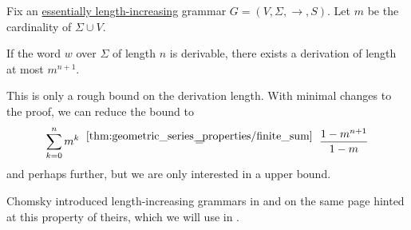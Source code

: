 \begin{lemma}\label{thm:length_increasing_grammar}
  Fix an \hyperref[def:length_increasing_grammar]{essentially length-increasing} grammar \( G = (V, \Sigma, \to, S) \). Let \( m \) be the cardinality of \( \Sigma \cup V \).

  If the word \( w \) over \( \Sigma \) of length \( n \) is derivable, there exists a derivation of length at most \( m^{n+1} \).
\end{lemma}
\begin{comments}
  \item This is only a rough bound on the derivation length. With minimal changes to the proof, we can reduce the bound to
  \begin{equation*}
    \sum_{k=0}^n m^k
    \reloset {\ref{thm:geometric_series_properties/finite_sum}} =
    \frac {1 - m^{n+1}} {1 - m}
  \end{equation*}
  and perhaps further, but we are only interested in a  upper bound.

  \item Chomsky introduced length-increasing grammars in \cite[360]{MathPsychology1963Vol2} and on the same page hinted at this property of theirs, which we will use in .
\end{comments}
